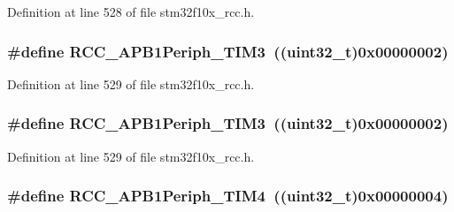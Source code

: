 Definition at line 528 of file stm32f10x\+\_\+rcc.\+h.

\subsubsection[{\texorpdfstring{R\+C\+C\+\_\+\+A\+P\+B1\+Periph\+\_\+\+T\+I\+M3}{RCC_APB1Periph_TIM3}}]{\setlength{\rightskip}{0pt plus 5cm}\#define R\+C\+C\+\_\+\+A\+P\+B1\+Periph\+\_\+\+T\+I\+M3~(({\bf uint32\+\_\+t})0x00000002)}\hypertarget{group___a_p_b1__peripheral_gad4454f63a511a256e55aad55c03beb76}{}\label{group___a_p_b1__peripheral_gad4454f63a511a256e55aad55c03beb76}


Definition at line 529 of file stm32f10x\+\_\+rcc.\+h.

\subsubsection[{\texorpdfstring{R\+C\+C\+\_\+\+A\+P\+B1\+Periph\+\_\+\+T\+I\+M3}{RCC_APB1Periph_TIM3}}]{\setlength{\rightskip}{0pt plus 5cm}\#define R\+C\+C\+\_\+\+A\+P\+B1\+Periph\+\_\+\+T\+I\+M3~(({\bf uint32\+\_\+t})0x00000002)}\hypertarget{group___a_p_b1__peripheral_gad4454f63a511a256e55aad55c03beb76}{}\label{group___a_p_b1__peripheral_gad4454f63a511a256e55aad55c03beb76}


Definition at line 529 of file stm32f10x\+\_\+rcc.\+h.

\subsubsection[{\texorpdfstring{R\+C\+C\+\_\+\+A\+P\+B1\+Periph\+\_\+\+T\+I\+M4}{RCC_APB1Periph_TIM4}}]{\setlength{\rightskip}{0pt plus 5cm}\#define R\+C\+C\+\_\+\+A\+P\+B1\+Periph\+\_\+\+T\+I\+M4~(({\bf uint32\+\_\+t})0x00000004)}\hypertarget{group___a_p_b1__peripheral_ga80f9f3720804a97210b723696bd94d83}{}\label{group___a_p_b1__peripheral_ga80f9f3720804a97210b723696bd94d83}


